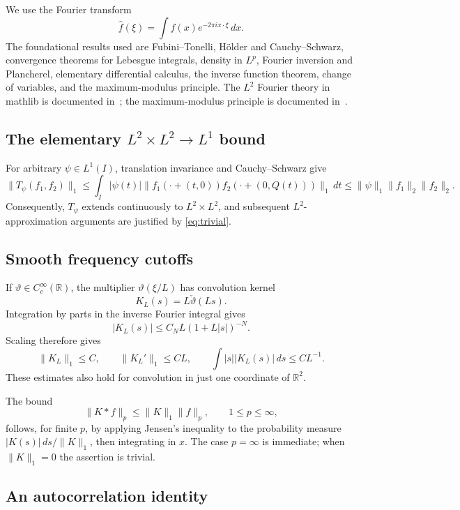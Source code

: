 \documentclass[11pt,a4paper]{article}
\newcommand{\R}{\mathbb R}
\begin{document}
We use the Fourier transform
\[
\widehat f(\xi)=\int f(x)e^{-2\pi i x\cdot\xi}\,dx.
\]
The foundational results used are Fubini--Tonelli, H\"older and
Cauchy--Schwarz, convergence theorems for Lebesgue integrals, density in
$L^p$, Fourier inversion and Plancherel, elementary differential calculus,
the inverse function theorem, change of variables, and the maximum-modulus
principle. The $L^2$ Fourier theory in mathlib is documented
in~\cite{mathlib-fourier}; the maximum-modulus principle is documented
in~\cite{mathlib-maximum}.

\subsection{The elementary \texorpdfstring{$L^2\times L^2\to L^1$}{L2 x L2 to L1} bound}

For arbitrary $\psi\in L^1(I)$, translation invariance and Cauchy--Schwarz give
\[
\|T_\psi(f_1,f_2)\|_1
\leq\int_I|\psi(t)|
\|f_1(\cdot+(t,0))f_2(\cdot+(0,Q(t)))\|_1\,dt
\leq\|\psi\|_1\|f_1\|_2\|f_2\|_2.
\tag{1.2}\label{eq:trivial}
\]
Consequently, $T_\psi$ extends continuously to $L^2\times L^2$, and
subsequent $L^2$-approximation arguments are justified by
\eqref{eq:trivial}.

\subsection{Smooth frequency cutoffs}

If $\vartheta\in C_c^\infty(\R)$, the multiplier $\vartheta(\xi/L)$ has
convolution kernel
\[
K_L(s)=L\check\vartheta(Ls).
\]
Integration by parts in the inverse Fourier integral gives
\[
|K_L(s)|\leq C_NL(1+L|s|)^{-N}.
\tag{1.3}\label{eq:kernel-decay}
\]
Scaling therefore gives
\[
\|K_L\|_1\leq C,\qquad
\|K_L'\|_1\leq CL,\qquad
\int |s||K_L(s)|\,ds\leq CL^{-1}.
\tag{1.4}\label{eq:kernel-norms}
\]
These estimates also hold for convolution in just one coordinate of $\R^2$.

The bound
\[
\|K*f\|_p\leq\|K\|_1\|f\|_p,\qquad 1\leq p\leq\infty,
\tag{1.5}\label{eq:young-l1}
\]
follows, for finite $p$, by applying Jensen's inequality to the probability
measure $|K(s)|\,ds/\|K\|_1$, then integrating in $x$. The case $p=\infty$
is immediate; when $\|K\|_1=0$ the assertion is trivial.

\subsection{An autocorrelation identity}
\end{document}
